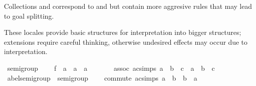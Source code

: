\begin{isabellebody}
\begin{isamarkuptext}
  Collections  and 
  correspond to  and 
  but contain more aggresive rules that may lead to goal splitting.%
\end{isamarkuptext}\isamarkuptrue%
%
\isadelimdocument
%
\endisadelimdocument
%
\isatagdocument
%
\isamarkuptrue%
%
\endisatagdocument
{\isafolddocument}%
%
\isadelimdocument
%
\endisadelimdocument
%
\begin{isamarkuptext}%
These locales provide basic structures for interpretation into bigger
  structures; extensions require careful thinking, otherwise undesired effects
  may occur due to interpretation.%
\end{isamarkuptext}\isamarkuptrue%
\isamarkupfalse%
\ semigroup\ {\isacharequal}{\kern0pt}\isanewline
\ \ \ f\ {\isacharcolon}{\kern0pt}{\isacharcolon}{\kern0pt}\ {\isachardoublequoteopen}{\isacharprime}{\kern0pt}a\ {\isasymRightarrow}\ {\isacharprime}{\kern0pt}a\ {\isasymRightarrow}\ {\isacharprime}{\kern0pt}a{\isachardoublequoteclose}\ \ {\isacharparenleft}{\kern0pt}\ {\isachardoublequoteopen}\isactrlbold {\isacharasterisk}{\kern0pt}{\isachardoublequoteclose}\ {}{}{\isacharparenright}{\kern0pt}\isanewline
\ \ \ assoc\ {\isacharbrackleft}{\kern0pt}ac{\isacharunderscore}{\kern0pt}simps{\isacharbrackright}{\kern0pt}{\isacharcolon}{\kern0pt}\ {\isachardoublequoteopen}a\ \isactrlbold {\isacharasterisk}{\kern0pt}\ b\ \isactrlbold {\isacharasterisk}{\kern0pt}\ c\ {\isacharequal}{\kern0pt}\ a\ \isactrlbold {\isacharasterisk}{\kern0pt}\ {\isacharparenleft}{\kern0pt}b\ \isactrlbold {\isacharasterisk}{\kern0pt}\ c{\isacharparenright}{\kern0pt}{\isachardoublequoteclose}\isanewline
\isanewline
{}\isamarkupfalse%
\ abel{\isacharunderscore}{\kern0pt}semigroup\ {\isacharequal}{\kern0pt}\ semigroup\ {\isacharplus}{\kern0pt}\isanewline
\ \ \ commute\ {\isacharbrackleft}{\kern0pt}ac{\isacharunderscore}{\kern0pt}simps{\isacharbrackright}{\kern0pt}{\isacharcolon}{\kern0pt}\ {\isachardoublequoteopen}a\ \isactrlbold {\isacharasterisk}{\kern0pt}\ b\ {\isacharequal}{\kern0pt}\ b\ \isactrlbold {\isacharasterisk}{\kern0pt}\ a{\isachardoublequoteclose}\isanewline
{}\isanewline
\isanewline
{}\isamarkupfalse%

\end{isabellebody}
